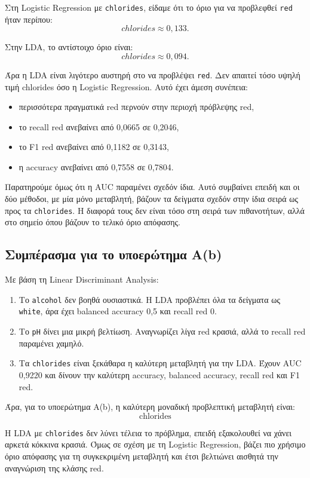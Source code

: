 \documentclass[11pt,a4paper]{article}
\newcommand{\code}[1]{\texttt{#1}}
\begin{document}
Στη Logistic Regression με \code{chlorides}, είδαμε ότι το όριο για να
προβλεφθεί \code{red} ήταν περίπου:
\[
chlorides \approx 0{,}133.
\]

Στην LDA, το αντίστοιχο όριο είναι:
\[
chlorides \approx 0{,}094.
\]

Άρα η LDA είναι λιγότερο αυστηρή στο να προβλέψει \code{red}. Δεν απαιτεί
τόσο υψηλή τιμή chlorides όσο η Logistic Regression. Αυτό έχει άμεση συνέπεια:
\begin{itemize}
    \item περισσότερα πραγματικά red περνούν στην περιοχή πρόβλεψης red,
    \item το recall red ανεβαίνει από 0,0665 σε 0,2046,
    \item το F1 red ανεβαίνει από 0,1182 σε 0,3143,
    \item η accuracy ανεβαίνει από 0,7558 σε 0,7804.
\end{itemize}

Παρατηρούμε όμως ότι η AUC παραμένει σχεδόν ίδια. Αυτό συμβαίνει επειδή και
οι δύο μέθοδοι, με μία μόνο μεταβλητή, βάζουν τα δείγματα σχεδόν στην ίδια
σειρά ως προς τα \code{chlorides}. Η διαφορά τους δεν είναι τόσο στη σειρά
των πιθανοτήτων, αλλά στο σημείο όπου βάζουν το τελικό όριο απόφασης.

\subsection{Συμπέρασμα για το υποερώτημα Α(b)}

Με βάση τη Linear Discriminant Analysis:
\begin{enumerate}
    \item Το \code{alcohol} δεν βοηθά ουσιαστικά. Η LDA προβλέπει όλα τα
    δείγματα ως \code{white}, άρα έχει balanced accuracy 0,5 και recall red 0.

    \item Το \code{pH} δίνει μια μικρή βελτίωση. Αναγνωρίζει λίγα red κρασιά,
    αλλά το recall red παραμένει χαμηλό.

    \item Τα \code{chlorides} είναι ξεκάθαρα η καλύτερη μεταβλητή για την LDA.
    Έχουν AUC 0,9220 και δίνουν την καλύτερη accuracy, balanced accuracy,
    recall red και F1 red.
\end{enumerate}

Άρα, για το υποερώτημα Α(b), η καλύτερη μοναδική προβλεπτική μεταβλητή είναι:
\[
\boxed{\text{chlorides}}
\]

Η LDA με \code{chlorides} δεν λύνει τέλεια το πρόβλημα, επειδή εξακολουθεί να
χάνει αρκετά κόκκινα κρασιά. Όμως σε σχέση με τη Logistic Regression, βάζει
πιο χρήσιμο όριο απόφασης για τη συγκεκριμένη μεταβλητή και έτσι βελτιώνει
αισθητά την αναγνώριση της κλάσης red.
\end{document}
